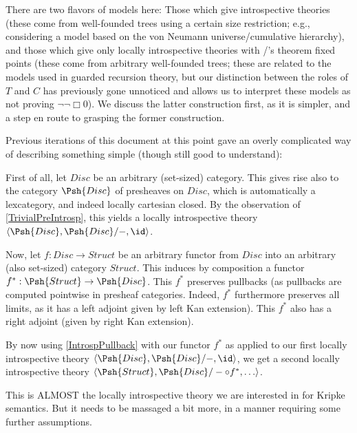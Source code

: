 There are two flavors of models here: Those which give introspective theories (these come from well-founded trees using a certain size restriction; e.g., considering a model based on the von Neumann universe/cumulative hierarchy), and those which give only locally introspective theories with \Loeb/'s theorem fixed points (these come from arbitrary well-founded trees; these are related to the models used in guarded recursion theory, but our distinction between the roles of $T$ and $C$ has previously gone unnoticed and allows us to interpret these models as not proving $\lnot \lnot \Box 0$). We discuss the latter construction first, as it is simpler, and a step en route to grasping the former construction.

Previous iterations of this document at this point gave an overly complicated way of describing something simple (though still good to understand):

First of all, let $Disc$ be an arbitrary (set-sized) category. This gives rise also to the category $\Psh{Disc}$ of presheaves on $Disc$, which is automatically a lexcategory, and indeed locally cartesian closed. By the observation of \cref{TrivialPreIntrosp}, this yields a locally introspective theory $\langle \Psh{Disc}, \Psh{Disc}/-, \id \rangle$.

Now, let $f : Disc \to Struct$ be an arbitrary functor from $Disc$ into an arbitrary (also set-sized) category $Struct$. This induces by composition a functor $f^* : \Psh{Struct} \to \Psh{Disc}$. This $f^*$ preserves pullbacks (as pullbacks are computed pointwise in presheaf categories. Indeed, $f^*$ furthermore preserves all limits, as it has a left adjoint given by left Kan extension). This $f^*$ also has a right adjoint (given by right Kan extension).


By now using \cref{IntrospPullback} with our functor $f^*$ as applied to our first locally introspective theory $\langle \Psh{Disc}, \Psh{Disc}/-, \id \rangle$, we get a second locally introspective theory $\langle \Psh{Struct}, \Psh{Disc}/- \circ f^*, \ldots \rangle$.

This is ALMOST the locally introspective theory we are interested in for Kripke semantics. But it needs to be massaged a bit more, in a manner requiring some further assumptions. 

